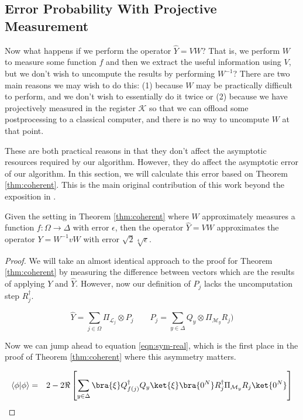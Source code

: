 \subsection{Error Probability With Projective Measurement}
\label{subsec:error-proj}

Now what happens if we perform the operator $\hat{Y} = VW$? That is, we
perform $W$ to measure some function $f$ and then we extract the useful
information using $V$, but we don't wish to uncompute the results by
performing $W^{-1}$? There are two main reasons we may wish to do this:
(1) because $W$ may be practically difficult to perform, and we don't wish
to essentially do it twice or (2) because we have projectively measured
in the register $\mathcal{K}$ so that we can offload some postprocessing to
a classical computer, and there is no way to uncompute $W$ at that point.

These are both practical reasons in that they don't affect the
asymptotic resources required by our algorithm. However, they do affect
the asymptotic error of our algorithm. In this section, we will calculate
this error based on Theorem \ref{thm:coherent}. This is the main original
contribution of this work beyond the exposition in \cite{ksv02}.

\begin{theorem}
\label{thm:projective}
Given the setting in Theorem \ref{thm:coherent}
where $W$ approximately measures a function $f : \Omega \rightarrow \Delta$
with error $\epsilon$, then the operator $\hat{Y} = VW$ approximates
the operator $Y = W^{-1}vW$ with error $\sqrt{2}\sqrt[4]{\epsilon}$.
\end{theorem}

\begin{proof}
We will take an almost identical approach to the proof for Theorem \ref{thm:coherent}
by measuring the difference between vectors which are the results of applying
$Y$ and $\hat{Y}$. However, now our definition of $P_j$ lacks the
uncomputation step $R_j^{\dagger}$.

\begin{equation}
\hat{Y} = \sum_{j \in \Omega} \Pi_{\mathcal{L}_j} \otimes P_j \qquad
P_j = \sum_{y \in \Delta} Q_y \otimes \Pi_{\mathcal{M}_y}R_j)
\end{equation}

Now we can jump ahead to equation \ref{eqn:sym-real}, which is the first
place in the proof of Theorem \ref{thm:coherent} where this asymmetry matters.

\begin{eqnarray}
\braket{\phi}{\phi} & = & 2 - 2\Re\left[ \sum_{y \in \Delta} \bra{\xi}Q_{f(j)}^{\dagger}Q_y \ket{\xi}
                                                             \bra{0^N}R_j^{\dagger}\Pi_{\mathcal{M}_y}R_j\ket{0^N} \right]
\end{eqnarray}
\end{proof}

